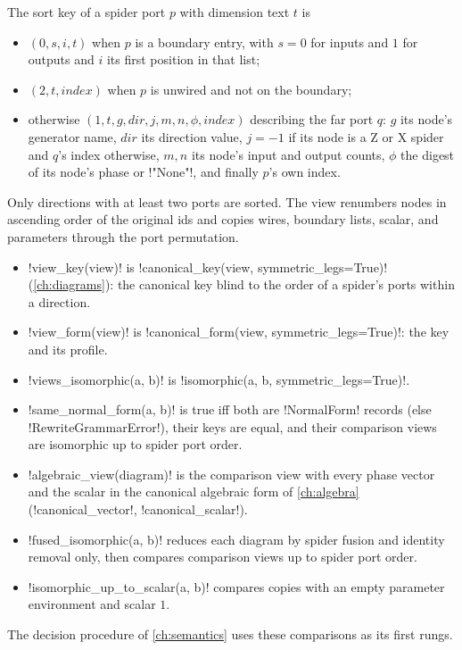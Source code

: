 The sort key of a spider port $p$ with dimension text $t$ is
\begin{itemize}
\item $(0, s, i, t)$ when $p$ is a boundary entry, with $s=0$ for inputs and $1$ for outputs and $i$
  its first position in that list;
\item $(2, t, \mathit{index})$ when $p$ is unwired and not on the boundary;
\item otherwise $(1, t, g, \mathit{dir}, j, m, n, \phi, \mathit{index})$ describing the far port $q$:
  $g$ its node's generator name, $\mathit{dir}$ its direction value, $j=-1$ if its node is a Z or X
  spider and $q$'s index otherwise, $m,n$ its node's input and output counts, $\phi$ the digest of
  its node's phase or \code!"None"!, and finally $p$'s own index.
\end{itemize}
Only directions with at least two ports are sorted. The view renumbers nodes in ascending order of
the original ids and copies wires, boundary lists, scalar, and parameters through the port
permutation.

\begin{itemize}
\item \py!view_key(view)! is \py!canonical_key(view, symmetric_legs=True)! (\cref{ch:diagrams}):
  the canonical key blind to the order of a spider's ports within a direction.
\item \py!view_form(view)! is \py!canonical_form(view, symmetric_legs=True)!: the key and its
  profile.
\item \py!views_isomorphic(a, b)! is \py!isomorphic(a, b, symmetric_legs=True)!.
\item \py!same_normal_form(a, b)! is true iff both are \py!NormalForm! records (else
  \py!RewriteGrammarError!), their keys are equal, and their comparison views are isomorphic up to
  spider port order.
\item \py!algebraic_view(diagram)! is the comparison view with every phase vector and the scalar
  in the canonical algebraic form of \cref{ch:algebra} (\py!canonical_vector!,
  \py!canonical_scalar!).
\item \py!fused_isomorphic(a, b)! reduces each diagram by spider fusion and identity removal only,
  then compares comparison views up to spider port order.
\item \py!isomorphic_up_to_scalar(a, b)! compares copies with an empty parameter environment and
  scalar $1$.
\end{itemize}

The decision procedure of \cref{ch:semantics} uses these comparisons as its first rungs.

